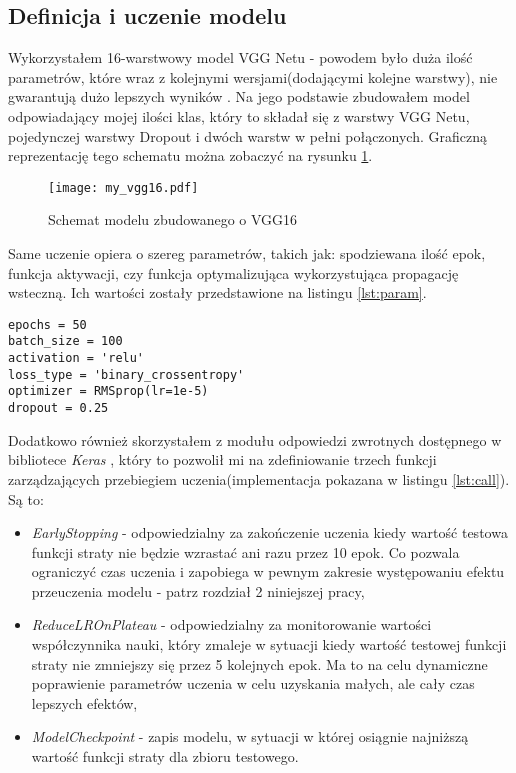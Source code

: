 \subsection{Definicja i uczenie modelu}

Wykorzystałem 16-warstwowy model VGG Netu - powodem było duża ilość parametrów, które wraz z kolejnymi wersjami(dodającymi kolejne warstwy), nie gwarantują dużo lepszych wyników \cite{vgg}. Na jego podstawie zbudowałem model odpowiadający mojej ilości klas, który to składał się z warstwy VGG Netu, pojedynczej warstwy Dropout i dwóch warstw w pełni połączonych. Graficzną reprezentację tego schematu można zobaczyć na rysunku \ref{fig:my_vgg16}.

\begin{figure}[h!]
	\texttt{[image: my\_vgg16.pdf]}
	\centering
	\caption{Schemat modelu zbudowanego o VGG16}
	\label{fig:my_vgg16}
\end{figure}

Same uczenie opiera o szereg parametrów, takich jak: spodziewana ilość epok, funkcja aktywacji, czy funkcja optymalizująca wykorzystująca propagację wsteczną. Ich wartości zostały przedstawione na listingu \ref{lst:param}.

\begin{lstlisting}[caption={Parametry pracy modelu opartego o transfer wiedzy i sieć VGG Net}, label={lst:param}]
epochs = 50
batch_size = 100
activation = 'relu'
loss_type = 'binary_crossentropy'
optimizer = RMSprop(lr=1e-5)
dropout = 0.25
\end{lstlisting}

Dodatkowo również skorzystałem z modułu odpowiedzi zwrotnych dostępnego w bibliotece \textit{Keras} \cite{keras}, który to pozwolił mi na zdefiniowanie trzech funkcji zarządzających przebiegiem uczenia(implementacja pokazana w listingu \ref{lst:call}). Są to:
\begin{itemize}
	\item \textit{EarlyStopping} - odpowiedzialny za zakończenie uczenia kiedy wartość testowa funkcji straty nie będzie wzrastać ani razu przez 10 epok. Co pozwala ograniczyć czas uczenia i zapobiega w pewnym zakresie występowaniu efektu przeuczenia modelu - patrz rozdział 2 niniejszej pracy,
	\item \textit{ReduceLROnPlateau} - odpowiedzialny za monitorowanie wartości współczynnika nauki, który zmaleje w sytuacji kiedy wartość testowej funkcji straty nie zmniejszy się przez 5 kolejnych epok. Ma to na celu dynamiczne poprawienie parametrów uczenia w celu uzyskania małych, ale cały czas lepszych efektów,
	\item \textit{ModelCheckpoint} - zapis modelu, w sytuacji w której osiągnie najniższą wartość funkcji straty dla zbioru testowego.
\end{itemize}


